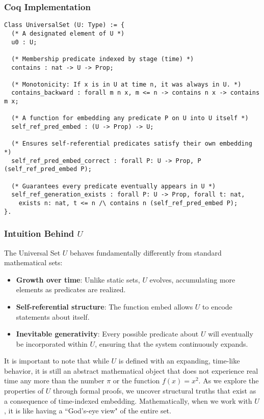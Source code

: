 \documentclass[12pt]{article}
\begin{document}
\subsubsection{Coq Implementation}

\begin{lstlisting}[language=Coq]
Class UniversalSet (U: Type) := {
  (* A designated element of U *)
  u0 : U;                            

  (* Membership predicate indexed by stage (time) *)
  contains : nat -> U -> Prop;       

  (* Monotonicity: If x is in U at time n, it was always in U. *)
  contains_backward : forall m n x, m <= n -> contains n x -> contains m x;

  (* A function for embedding any predicate P on U into U itself *)
  self_ref_pred_embed : (U -> Prop) -> U;

  (* Ensures self-referential predicates satisfy their own embedding *)
  self_ref_pred_embed_correct : forall P: U -> Prop, P (self_ref_pred_embed P);

  (* Guarantees every predicate eventually appears in U *)
  self_ref_generation_exists : forall P: U -> Prop, forall t: nat, 
    exists n: nat, t <= n /\ contains n (self_ref_pred_embed P);
}.
\end{lstlisting}

\subsubsection{Intuition Behind \( U \)}

The Universal Set \( U \) behaves fundamentally differently from standard mathematical sets:

\begin{itemize}
    \item \textbf{Growth over time}: Unlike static sets, \( U \) evolves, accumulating more elements as predicates are realized.
    \item \textbf{Self-referential structure}: The function \( \text{embed} \) allows \( U \) to encode statements about itself.
    \item \textbf{Inevitable generativity}: Every possible predicate about \( U \) will eventually be incorporated within \( U \), ensuring that the system continuously expands.
\end{itemize}

It is important to note that while $U$ is defined with an expanding, time-like behavior, it is still an abstract mathematical object that does not experience real time any more than the number $\pi$ or the function $f(x)=x^2$. As we explore the properties of $U$ through formal proofs, we uncover structural truths that exist as a consequence of time-indexed embedding. Mathematically, when we work with $U$, it is like having a ``God's-eye view" of the entire set.
\end{document}
